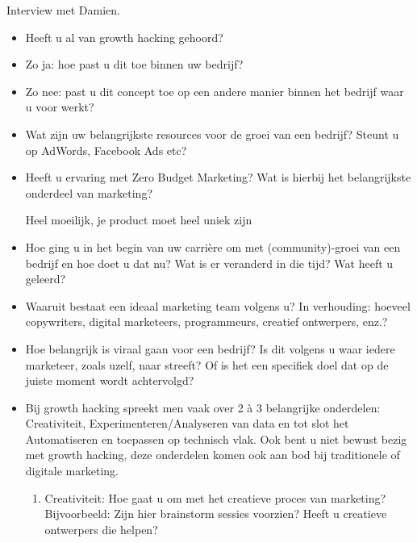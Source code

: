 Interview met Damien.
\begin{itemize} 
	\item Heeft u al van growth hacking gehoord?
	

	
	\item Zo ja: hoe past u dit toe binnen uw bedrijf?
	

	
	\item Zo nee: past u dit concept toe op een andere manier binnen het bedrijf waar u voor werkt?
	

	
	\item Wat zijn uw belangrijkste resources voor de groei van een bedrijf? Steunt u op AdWords, Facebook Ads etc?
	


	\item Heeft u ervaring met Zero Budget Marketing? Wat is hierbij het belangrijkste onderdeel van marketing?
	
Heel moeilijk, je product moet heel uniek zijn
	
	\item Hoe ging u in het begin van uw carrière om met (community)-groei van een bedrijf en hoe doet u dat nu? Wat is er veranderd in die tijd? Wat heeft u geleerd?
	

	
	\item Waaruit bestaat een ideaal marketing team volgens u? In verhouding: hoeveel copywriters, digital marketeers, programmeurs, creatief ontwerpers, enz.?
	
	
	
	\item Hoe belangrijk is viraal gaan voor een bedrijf? Is dit volgens u waar iedere marketeer, zoals uzelf, naar streeft? Of is het een specifiek doel dat op de juiste moment wordt achtervolgd?
	
	
	
	\item Bij growth hacking spreekt men vaak over 2 à 3 belangrijke onderdelen: Creativiteit, Experimenteren/Analyseren van data en tot slot het Automatiseren en toepassen op technisch vlak. Ook bent u niet bewust bezig met growth hacking, deze onderdelen komen ook aan bod bij traditionele of digitale marketing.
	\begin{enumerate}[label*=\arabic*.]
		\item Creativiteit: Hoe gaat u om met het creatieve proces van marketing? Bijvoorbeeld: Zijn hier brainstorm sessies voorzien? Heeft u creatieve ontwerpers die helpen?
		

\end{enumerate}
\end{itemize}
